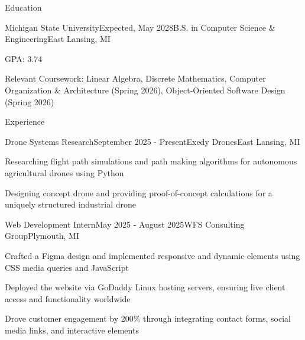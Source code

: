 \documentclass[
	11pt
]{resume}
\begin{document}
	\begin{rSection}{E}{ducation}
		\begin{rSectionEntry}{Michigan State University}{Expected, May 2028}{B.S. in Computer Science \& Engineering}{East Lansing, MI}
			\item GPA: 3.74
			\item Relevant Coursework: Linear Algebra, Discrete Mathematics, Computer Organization \& Architecture (Spring 2026), Object-Oriented Software Design (Spring 2026)
		\end{rSectionEntry}
	\end{rSection}

	\begin{rSection}{E}{xperience}
		\begin{rSectionEntry}{Drone Systems Research}{September 2025 - Present}{Exedy Drones}{East Lansing, MI}
			\item Researching flight path simulations and path making algorithms for autonomous agricultural drones using Python
			\item Designing concept drone and providing proof-of-concept calculations for a uniquely structured industrial drone
		\end{rSectionEntry}

		\begin{rSectionEntry}{Web Development Intern}{May 2025 - August 2025}{WFS Consulting Group}{Plymouth, MI}
			\item Crafted a Figma design and implemented responsive and dynamic elements using CSS media queries and JavaScript
			\item Deployed the website via GoDaddy Linux hosting servers, ensuring live client access and functionality worldwide
			\item Drove customer engagement by 200\% through integrating contact forms, social media links, and interactive elements
		\end{rSectionEntry}
	\end{rSection}
\end{document}
